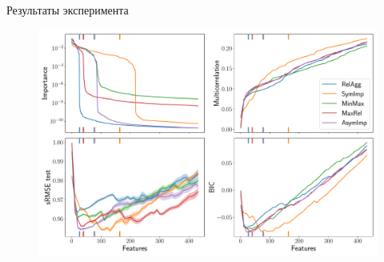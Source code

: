 \documentclass[9pt]{beamer}
\begin{document}
\begin{frame}{Результаты эксперимента}
	\begin{figure}
		\includegraphics[width=\linewidth]{figs/ecog_3_30_metrics.pdf}
	\end{figure}
\end{frame}
\end{document}

